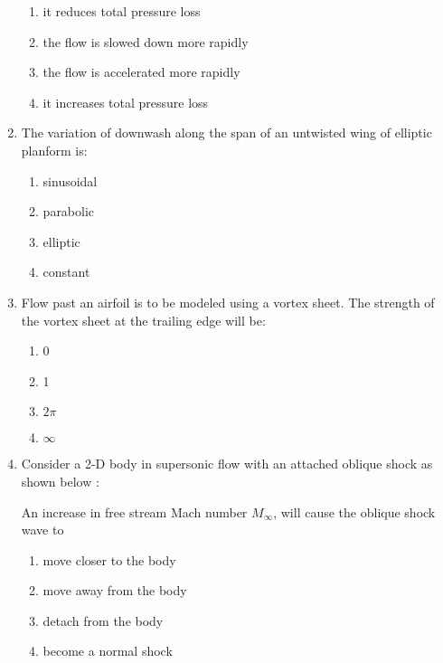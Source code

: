 \documentclass[journal]{IEEEtran}
\begin{document}
\begin{enumerate}[start=35]
\begin{enumerate}
    \item it reduces total pressure loss
    \item the flow is slowed down more rapidly
    \item the flow is accelerated more rapidly
    \item it increases total pressure loss
\end{enumerate}
\item The variation of downwash along the span of an untwisted wing of elliptic planform is:
\begin{enumerate}
    \item sinusoidal
    \item parabolic
    \item elliptic
    \item constant
\end{enumerate}
\item Flow past an airfoil is to be modeled using a vortex sheet. The strength of the vortex sheet at the trailing edge will be:
\begin{enumerate}
    \item 0
    \item 1
    \item $2\pi$
    \item $\infty$
\end{enumerate}
\item Consider a 2-D body in supersonic flow with an attached oblique shock as shown below :
\begin{figure}[!ht]
\centering
{}%

\label{fig:my_label}
\end{figure}
An increase in free stream Mach number $M_\infty$, will cause the oblique shock wave to
\begin{enumerate}
    \item move closer to the body
    \item move away from the body
    \item detach from the body
    \item become a normal shock
\end{enumerate}
\end{enumerate}
\end{document}
